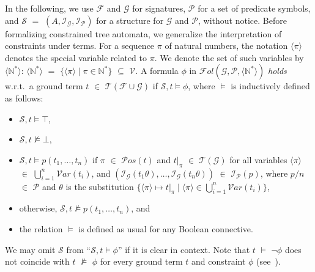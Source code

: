 \documentclass[copyright,creativecommons]{eptcs}
\newcommand{\cF}{\mathcal{F}}
\newcommand{\cG}{\mathcal{G}}
\newcommand{\cI}{\mathcal{I}}
\newcommand{\cP}{\mathcal{P}}
\newcommand{\cS}{\mathcal{S}}
\newcommand{\cV}{\mathcal{V}}
\newcommand{\Var}{{\mathcal{V}ar}}
\newcommand{\Pos}{{\mathcal{P}os}}
\newcommand{\posvar}[1]{{\langle}#1{\rangle}}
\newcommand{\Terms}{{\mathcal{T}}}
\newcommand{\Fol}{{\mathcal{F}\!\mathit{ol}}}
\begin{document}
In the following, we use $\cF$ and $\cG$ for signatures, $\cP$ for a set of
 predicate symbols, and $\cS$ $=$ $(A,\cI_\cG,\cI_\cP)$ for a structure
 for $\cG$ and $\cP$, without notice. 
Before formalizing constrained tree automata, 
we generalize the interpretation of constraints under terms.
For a sequence $\pi$ of natural numbers, the notation $\posvar{\pi}$ denotes
the special variable related to $\pi$.
We denote the set of such variables by $\posvar{\mathbb{N}^*}$:
$\posvar{\mathbb{N}^*}$ $=$ $\{ \posvar{\pi} \mid \pi \in \mathbb{N}^* \}$
$\subseteq$ $\cV$.
A formula $\phi$ in $\Fol(\cG,\cP,\posvar{\mathbb{N}^*})$ \emph{holds}
 w.r.t.\ a ground term $t$ $\in$ $\Terms(\cF\cup\cG)$ if $\cS,t \models
 \phi$, where $\models$ is inductively defined as follows: 
 \begin{itemize}
  \item $\cS,t \models \top$,
  \item $\cS,t \not\models \bot$,
  \item $\cS,t \models p(t_1,\ldots,t_n)$ if $\pi$ $\in$
	$\Pos(t)$ and $t|_\pi$ $\in$ $\Terms(\cG)$ for all variables
	$\posvar{\pi}$ $\in$ $\bigcup_{i=1}^n \Var(t_i)$, and
	$(\cI_\cG(t_1\theta),\ldots,\cI_\cG(t_n\theta))$ $\in$
	$\cI_\cP(p)$, where $p/n$ $\in$ $\cP$ and $\theta$ is the
	substitution $\{ \posvar{\pi} \mapsto t|_\pi \mid \posvar{\pi}
	\in \bigcup_{i=1}^n \Var(t_i) \}$,
  \item otherwise, $\cS,t \not\models p(t_1,\ldots,t_n)$, and
  \item the relation $\models$ is defined as usual for any Boolean
	connective. \end{itemize}
We may omit $\cS$ from ``$\cS,t \models \phi$'' if it is clear in context.
Note that $t$ $\models$ $\neg \phi$ does not coincide with $t$
$\not\models$ $\phi$ for every ground term $t$ and constraint $\phi$
(see~\cite{CTA}).
\end{document}
